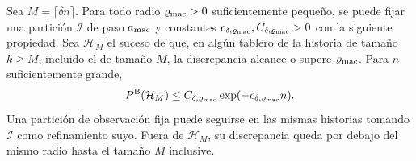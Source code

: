 \begin{proposicion}\label{macro:parada}
Sea $M=\lceil\delta n\rceil$. Para todo radio $\varrho_{\rm mac}>0$ suficientemente pequeño, se
puede fijar una partición $\mathcal I$ de paso $a_{\rm mac}$ y constantes
$c_{\delta,\varrho_{\rm mac}},C_{\delta,\varrho_{\rm mac}}>0$ con la siguiente propiedad. Sea
$\mathcal H_M$ el suceso de que, en algún tablero de la historia de tamaño ${k\ge M}$, incluido el de
tamaño $M$, la discrepancia alcance o supere $\varrho_{\rm mac}$. Para $n$ suficientemente grande,
\[
 P^{\rm B}(\mathcal H_M)\le C_{\delta,\varrho_{\rm mac}}\exp(-c_{\delta,\varrho_{\rm mac}}n).
\]
Una partición de observación fija puede seguirse en las mismas historias tomando $\mathcal I$ como
refinamiento suyo. Fuera de $\mathcal H_M$, su discrepancia queda por debajo del mismo radio hasta el
tamaño $M$ inclusive.
\end{proposicion}
